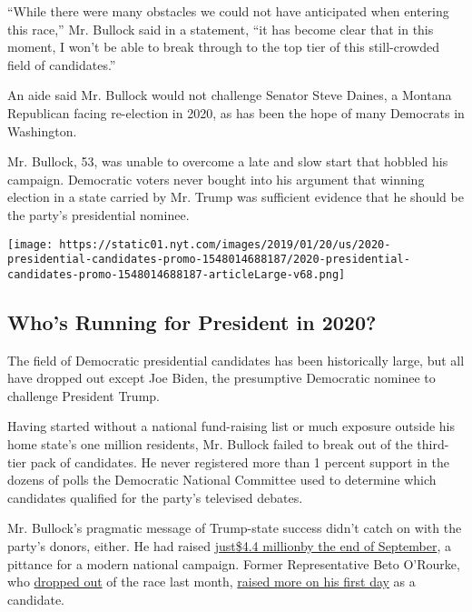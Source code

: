``While there were many obstacles we could not have anticipated when
entering this race,'' Mr. Bullock said in a statement, ``it has become
clear that in this moment, I won't be able to break through to the top
tier of this still-crowded field of candidates.''

An aide said Mr. Bullock would not challenge Senator Steve Daines, a
Montana Republican facing re-election in 2020, as has been the hope of
many Democrats in Washington.

Mr. Bullock, 53, was unable to overcome a late and slow start that
hobbled his campaign. Democratic voters never bought into his argument
that winning election in a state carried by Mr. Trump was sufficient
evidence that he should be the party's presidential nominee.

\href{https://www.nytimes.com/interactive/2019/us/politics/2020-presidential-candidates.html}{}

\texttt{[image: https://static01.nyt.com/images/2019/01/20/us/2020-presidential-candidates-promo-1548014688187/2020-presidential-candidates-promo-1548014688187-articleLarge-v68.png]}

\hypertarget{whos-running-for-president-in-2020}{%
\subsection{Who's Running for President in
2020?}\label{whos-running-for-president-in-2020}}

The field of Democratic presidential candidates has been historically
large, but all have dropped out except Joe Biden, the presumptive
Democratic nominee to challenge President Trump.

Having started without a national fund-raising list or much exposure
outside his home state's one million residents, Mr. Bullock failed to
break out of the third-tier pack of candidates. He never registered more
than 1 percent support in the dozens of polls the Democratic National
Committee used to determine which candidates qualified for the party's
televised debates.

Mr. Bullock's pragmatic message of Trump-state success didn't catch on
with the party's donors, either. He had raised
\href{https://www.nytimes.com/interactive/2019/10/16/us/elections/democratic-q3-fundraising.html}{just}\href{https://www.nytimes.com/interactive/2019/10/16/us/elections/democratic-q3-fundraising.html}{\$4.4
million}\href{https://www.nytimes.com/interactive/2019/10/16/us/elections/democratic-q3-fundraising.html}{by
the end of September}, a pittance for a modern national campaign. Former
Representative Beto O'Rourke, who
\href{https://www.nytimes.com/2019/11/01/us/politics/beto-orourke-drops-out.html}{dropped
out} of the race last month,
\href{https://www.nytimes.com/2019/03/18/us/politics/beto-o-rourke-fundraising.html}{raised
more on his first day} as a candidate.

